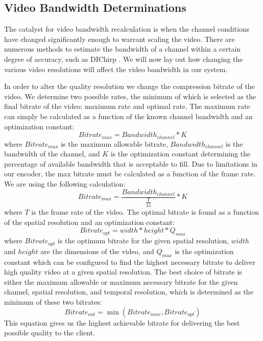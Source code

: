 \documentclass[a4paper,12pt]{article}
\begin{document}
\subsection{Video Bandwidth Determinations}
The catalyst for video bandwidth recalculation is when the channel conditions have changed significantly enough to warrant scaling the video. There are numerous methods to estimate the bandwidth of a channel within a certain degree of accuracy, such as DIChirp \cite{DIChirp}. We will now lay out how changing the various video resolutions will affect the video bandwidth in our system.

In order to alter the quality resolution we change the compression bitrate of the video. We determine two possible rates, the minimum of which is selected as the final bitrate of the video: maximum rate and optimal rate. The maximum rate can simply be calculated as a function of the known channel bandwidth and an optimization constant:
\begin{equation}
\label{equ:BitrateCalculation}
Bitrate_{max} = Bandwidth_{channel} * K
\end{equation}
where $Bitrate_{max}$  is the maximum allowable bitrate, $Bandwidth_{channel}$ is the bandwidth of the channel, and $K$ is the optimization constant determining the percentage of available bandwidth that is acceptable to fill. Due to limitations in our encoder, the max bitrate must be calculated as a function of the frame rate. We are using the following calculation: 
\begin{equation}
\label{equ:LimitedBitrateCalculation}
Bitrate_{max} = \frac {Bandwidth_{channel}}{\frac {T} {15} } * K
\end{equation}
where $T$ is the frame rate of the video. The optimal bitrate is found as a function of the spatial resolution and an optimization constant:
\begin{equation}
\label{equ:OptimalBitrate}
Bitrate_{opt} = width * height * Q_{max}
\end{equation}
where $Bitrate_{opt}$ is the optimum bitrate for the given spatial resolution, $width$ and $height$ are the dimensions of the video, and $Q_{max}$ is the optimization constant which can be configured to find the highest necessary bitrate to deliver high quality video at a given spatial resolution. The best choice of bitrate is either the maximum allowable or maximum necessary bitrate for the given channel, spatial resolution, and temporal resolution, which is determined as the minimum of these two bitrates:
\begin{equation}
\label{equ:OutputBitrate}
Bitrate_{out} = \min (Bitrate_{max} , Bitrate_{opt})
\end{equation}
This equation gives us the highest achievable bitrate for delivering the best possible quality to the client.
\end{document}
